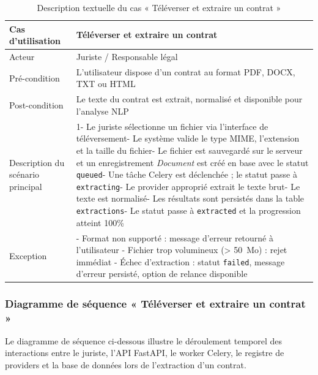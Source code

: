 \begin{table}[htbp]
\centering
\begin{tabular}{|p{4cm}|p{12cm}|}
\hline
\textbf{Cas d'utilisation} & \textbf{Téléverser et extraire un contrat} \\
\hline
Acteur & Juriste / Responsable légal \\
\hline
Pré-condition & L'utilisateur dispose d'un contrat au format PDF, DOCX, TXT ou HTML \\
\hline
Post-condition & Le texte du contrat est extrait, normalisé et disponible pour l'analyse NLP \\
\hline
Description du scénario principal &
1- Le juriste sélectionne un fichier via l'interface de téléversement\newline
2- Le système valide le type MIME, l'extension et la taille du fichier\newline
3- Le fichier est sauvegardé sur le serveur et un enregistrement \textit{Document} est créé en base avec le statut \texttt{queued}\newline
4- Une tâche Celery est déclenchée ; le statut passe à \texttt{extracting}\newline
5- Le provider approprié extrait le texte brut\newline
6- Le texte est normalisé\newline
7- Les résultats sont persistés dans la table \texttt{extractions}\newline
8- Le statut passe à \texttt{extracted} et la progression atteint 100\% \\
\hline
Exception &
- Format non supporté : message d'erreur retourné à l'utilisateur\newline
- Fichier trop volumineux (> 50~Mo) : rejet immédiat\newline
- Échec d'extraction : statut \texttt{failed}, message d'erreur persisté, option de relance disponible \\
\hline
\end{tabular}
\caption{Description textuelle du cas « Téléverser et extraire un contrat »}
\label{tab:uc_extraction}
\end{table}

\subsubsection{Diagramme de séquence « Téléverser et extraire un contrat »}

Le diagramme de séquence ci-dessous illustre le déroulement temporel des interactions entre le juriste, l'API FastAPI, le worker Celery, le registre de providers et la base de données lors de l'extraction d'un contrat.

